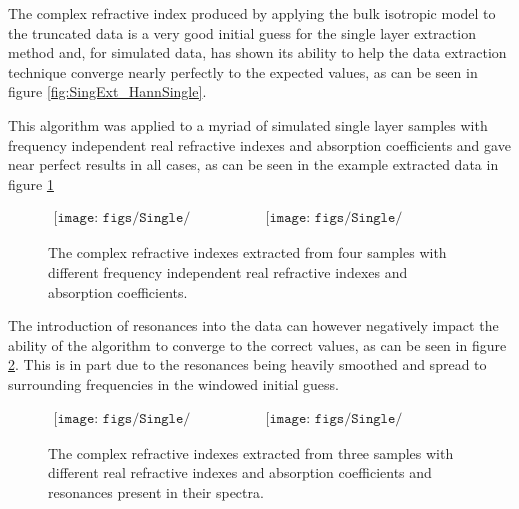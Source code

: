 The complex refractive index produced by applying the bulk isotropic model to the truncated data is a very good initial guess for the single layer extraction method and, for simulated data, has shown its ability to help the data extraction technique converge nearly perfectly to the expected values, as can be seen in figure \ref{fig:SingExt_HannSingle}.

This algorithm was applied to a myriad of simulated single layer samples with frequency independent real refractive indexes and absorption coefficients and gave near perfect results in all cases, as can be seen in the example extracted data in figure \ref{fig:SingExt_CompFlat}

\begin{figure}[H]
                \begin{center}$
								\begin{array}{cc}
                \texttt{[image: figs/Single/MultSingleN.png]}&
                \texttt{[image: figs/Single/MultSingleK.png]}
								\end{array}$
								\end{center}
	\caption[Extracted complex refractive index for single layer isotropic samples with uniform properties]{The complex refractive indexes extracted from four samples with different frequency independent real refractive indexes and absorption coefficients.}
	\label{fig:SingExt_CompFlat}
\end{figure}

The introduction of resonances into the data can however negatively impact the ability of the algorithm to converge to the correct values, as can be seen in figure \ref{fig:SingExt_CompRes}. This is in part due to the resonances being heavily smoothed and spread to surrounding frequencies in the windowed initial guess.

\begin{figure}[H]
                \begin{center}$
								\begin{array}{cc}
                \texttt{[image: figs/Single/MultSingleNRes.png]}&
                \texttt{[image: figs/Single/MultSingleKRes.png]}
								\end{array}$
								\end{center}
	\caption[Extracted complex refractive index for single layer isotropic samples with resonances present]{The complex refractive indexes extracted from three samples with different real refractive indexes and absorption coefficients and resonances present in their spectra.}
	\label{fig:SingExt_CompRes}
\end{figure}

